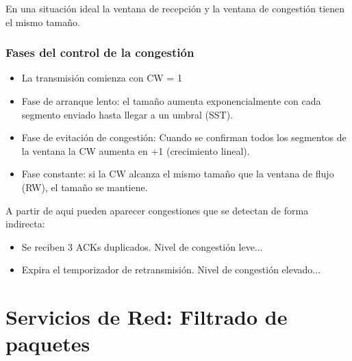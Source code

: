 En una situación ideal la ventana de recepción y la ventana de congestión tienen el mismo tamaño.\\

\subsubsection{Fases del control de la congestión}
\begin{itemize}
    \item La transmisión comienza con CW = 1
    \item Fase de arranque lento: el tamaño aumenta exponencialmente con cada segmento enviado hasta llegar a un umbral (SST).
    \item Fase de evitación de congestión: Cuando se confirman todos los segmentos de la ventana la CW aumenta en +1 (crecimiento lineal).
    \item Fase constante: si la CW alcanza el mismo tamaño que la ventana de flujo (RW), el tamaño se mantiene.
\end{itemize}
A partir de aqui pueden aparecer congestiones que se detectan de forma indirecta:
\begin{itemize}
    \item Se reciben 3 ACKs duplicados. Nivel de congestión leve...
    \item Expira el temporizador de retransmisión. Nivel de congestión elevado...
\end{itemize}
\section{Servicios de Red: Filtrado de paquetes}
